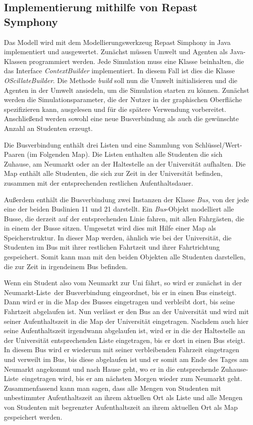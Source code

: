 \documentclass[12pt,a4paper]{scrartcl}
\begin{document}
\subsection{Implementierung mithilfe von Repast Symphony}\label{repast}

Das Modell wird mit dem Modellierungswerkzeug Repast Simphony in Java implementiert und ausgewertet. Zunächst müssen Umwelt und Agenten als Java-Klassen programmiert werden. Jede Simulation muss eine Klasse beinhalten, die das Interface \textit{ContextBuilder} implementiert. In diesem Fall ist dies die Klasse \textit{OScillateBuilder}. Die Methode \textit{build} soll nun die Umwelt initialisieren und die Agenten in der Umwelt ansiedeln, um die Simulation starten zu können. Zunächst werden die Simulationsparameter, die der Nutzer in der graphischen Oberfläche spezifizieren kann, ausgelesen und für die spätere Verwendung vorbereitet. Anschließend werden sowohl eine neue Busverbindung als auch die gewünschte Anzahl an Studenten erzeugt.

Die Busverbindung enthält drei Listen und eine Sammlung von Schlüssel/Wert-Paaren (im Folgenden Map). Die Listen enthalten alle Studenten die sich Zuhause, am Neumarkt oder an der Haltestelle an der Universität aufhalten. Die Map enthält alle Studenten, die sich zur Zeit in der Universität befinden, zusammen mit der entsprechenden restlichen Aufenthaltsdauer.

Außerdem enthält die Busverbindung zwei Instanzen der Klasse \textit{Bus}, von der jede eine der beiden Buslinien 11 und 21 darstellt. Ein \textit{Bus}-Objekt modelliert alle Busse, die derzeit auf der entsprechenden Linie fahren, mit allen Fahrgästen, die in einem der Busse sitzen. Umgesetzt wird dies mit Hilfe einer Map als Speicherstruktur. In dieser Map werden, ähnlich wie bei der Universität, die Studenten im Bus mit ihrer restlichen Fahrtzeit und ihrer Fahrtrichtung gespeichert. Somit kann man mit den beiden Objekten alle Studenten darstellen, die zur Zeit in irgendeinem Bus befinden.

Wenn ein Student also vom Neumarkt zur Uni fährt, so wird er zunächst in der \glqq Neumarkt-Liste\grqq~der Busverbindung eingeordnet, bis er in einen Bus einsteigt. Dann wird er in die Map des Busses eingetragen und verbleibt dort, bis seine Fahrtzeit abgelaufen ist. Nun verlässt er den Bus an der Universität und wird mit seiner Aufenthaltszeit in die Map der Universität eingetragen. Nachdem auch hier seine Aufenthaltszeit irgendwann abgelaufen ist, wird er in die der Haltestelle an der Universität entsprechenden Liste eingetragen, bis er dort in einen Bus steigt. In diesem Bus wird er wiederum mit seiner verbleibenden Fahrzeit eingetragen und verweilt im Bus, bis diese abgelaufen ist und er somit am Ende des Tages am Neumarkt angekommt und nach Hause geht, wo er in die entsprechende \glqq Zuhause-Liste\grqq~eingetragen wird, bis er am nächsten Morgen wieder zum Neumarkt geht. Zusammenfassend kann man sagen, dass alle Mengen von Studenten mit unbestimmter Aufenthaltszeit an ihrem aktuellen Ort als Liste und alle Mengen von Studenten mit begrenzter Aufenthaltszeit an ihrem aktuellen Ort als Map gespeichert werden.
\end{document}
